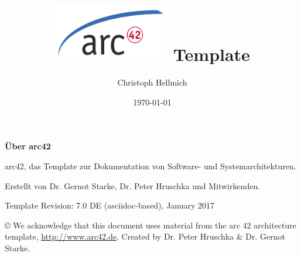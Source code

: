 \documentclass[]{article}
\title{\includegraphics{images/arc42-logo.png} Template}
\date{\today}
\author{Christoph Hellmich}
\begin{document}
\maketitle
\thispagestyle{empty} %

\tableofcontents

\section*{}

\textbf{Über arc42}

arc42, das Template zur Dokumentation von Software- und
Systemarchitekturen.

Erstellt von Dr. Gernot Starke, Dr. Peter Hruschka und Mitwirkenden.

Template Revision: 7.0 DE (asciidoc-based), January 2017

© We acknowledge that this document uses material from the arc 42
architecture template, \url{http://www.arc42.de}. Created by Dr. Peter
Hruschka \& Dr. Gernot Starke.


\end{document}
